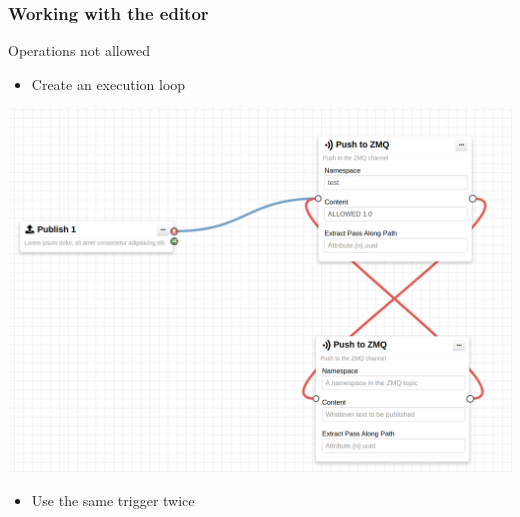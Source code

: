 \begin{frame}
    \frametitle{Working with the editor}
    Operations not allowed
    \begin{itemize}
        \item Create an execution loop
    \end{itemize}
    \begin{center}
        \includegraphics[width=0.7\linewidth]{pictures/editor-not-allowed-1.png}
    \end{center}
    \begin{itemize}
        \item Use the same trigger twice
    \end{itemize}
\end{frame}

